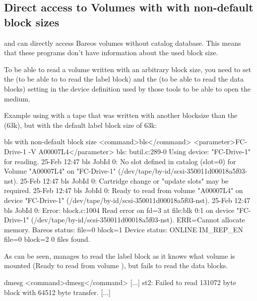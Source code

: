 \subsection*{Direct access to Volumes with with non-default block sizes}
\label{direct-access-to-volumes-with-non-default-blocksizes}


 and  can directly access Bareos volumes without catalog database.
This means that these programs don't have information about the used block size.

To be able to read a volume written with an arbitrary block size, you need to
set the   (to be able to to read the label block) and the
  (to be able to read the data blocks) setting in the
device definition used by those tools to be able to open the medium.

Example using  with a tape that was written with another blocksize than the
 (63k), but with the default label block size of 63k:
\begin{commands}{bls with non-default block size}
<command>bls</command> <parameter>FC-Drive-1 -V A00007L4</parameter>
bls: butil.c:289-0 Using device: "FC-Drive-1" for reading.
25-Feb 12:47 bls JobId 0: No slot defined in catalog (slot=0) for Volume "A00007L4" on "FC-Drive-1" (/dev/tape/by-id/scsi-350011d00018a5f03-nst).
25-Feb 12:47 bls JobId 0: Cartridge change or "update slots" may be required.
25-Feb 12:47 bls JobId 0: Ready to read from volume "A00007L4" on device "FC-Drive-1" (/dev/tape/by-id/scsi-350011d00018a5f03-nst).
25-Feb 12:47 bls JobId 0: Error: block.c:1004 Read error on fd=3 at file:blk 0:1 on device "FC-Drive-1" (/dev/tape/by-id/scsi-350011d00018a5f03-nst). ERR=Cannot allocate memory.
 Bareos status: file=0 block=1
 Device status: ONLINE IM_REP_EN file=0 block=2
0 files found.
\end{commands}

As can be seen,  manages to read the label block as it knows what volume is mounted
(Ready to read from volume ), but fails to read the data blocks.

\begin{commands}{dmesg}
<command>dmesg</command>
[...]
st2: Failed to read 131072 byte block with 64512 byte transfer.
[...]
\end{commands}

